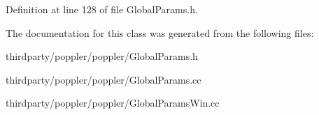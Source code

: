 Definition at line 128 of file Global\+Params.\+h.



The documentation for this class was generated from the following files\+:\begin{DoxyCompactItemize}
\item 
thirdparty/poppler/poppler/Global\+Params.\+h\item 
thirdparty/poppler/poppler/Global\+Params.\+cc\item 
thirdparty/poppler/poppler/Global\+Params\+Win.\+cc\end{DoxyCompactItemize}
